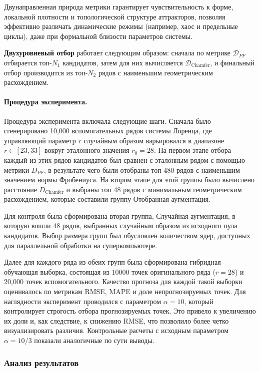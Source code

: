 Двунаправленная природа метрики гарантирует чувствительность к форме,
 локальной плотности и топологической структуре аттракторов, позволяя
 эффективно различать динамические режимы (например, хаос и предельные циклы), даже при
  формальной близости параметров системы.

\textbf{Двухуровневый отбор} работает следующим образом: сначала по метрике $\mathcal{D}_{PF}$ 
отбирается топ-$N_1$ кандидатов, затем для них вычисляется $\mathcal{D}_{\text{Chamfer}}$, и 
финальный отбор производится из топ-$N_2$ рядов с наименьшим геометрическим расхождением.

\paragraph{Процедура эксперимента.}
Процедура эксперимента включала следующие шаги. Сначала было сгенерировано 10,000
 вспомогательных рядов системы Лоренца, где управляющий параметр $r$ случайным 
 образом варьировался в диапазоне $r \in [23, 33]$ вокруг эталонного значения $r_0=28$. 
 На первом этапе отбора каждый из этих рядов-кандидатов был сравнен с эталонным рядом с 
 помощью метрики $D_{PF}$, в результате чего были отобраны топ 480 рядов с наименьшим 
 значением нормы Фробениуса. На втором этапе для этой группы было вычислено расстояние $D_{\text{Chamfer}}$ и выбраны 
топ 48 рядов с минимальным геометрическим расхождением, которые составили группу Отобранная аугментация.

Для контроля была сформирована вторая группа, Случайная аугментация, в которую вошли 48 рядов,
 выбранных случайным образом из исходного пула кандидатов. Выбор размера групп был обусловлен количеством
  ядер, доступных для параллельной обработки на суперкомпьютере.

Далее для каждого ряда из обеих групп была сформирована гибридная обучающая выборка, состоящая из 10000 
точек оригинального ряда ($r=28$) и 20,000 точек вспомогательного. Качество прогноза для каждой такой выборки
 оценивалось по метрикам RMSE, MAPE и доле непрогнозируемых точек. Для наглядности эксперимент проводился 
 с параметром $\alpha=10$, который контролирует строгость отбора прогнозируемых точек. Это привело к увеличению
  их доли и, как следствие, к снижению RMSE, что позволило более четко визуализировать различия. Контрольные 
  расчеты с исходным параметром $\alpha=10/3$ показали аналогичные по сути выводы.
\subsubsection{Анализ результатов}

